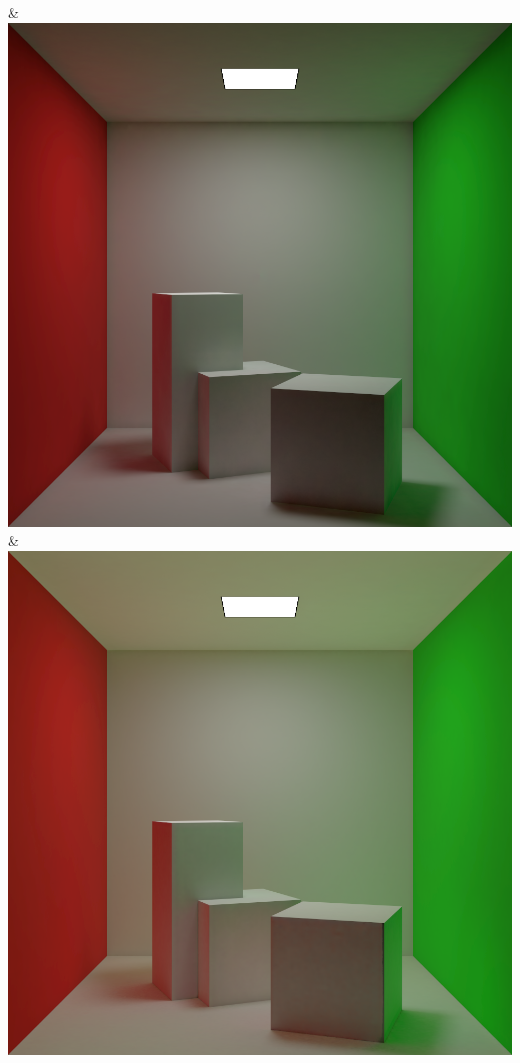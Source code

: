 & \includegraphics[width=\linewidth]{figures/py/tests/quality_comparison/nrc+bt_1min.png}
& \includegraphics[width=\linewidth]{figures/py/tests/quality_comparison/nrc+lt_1min.png}
